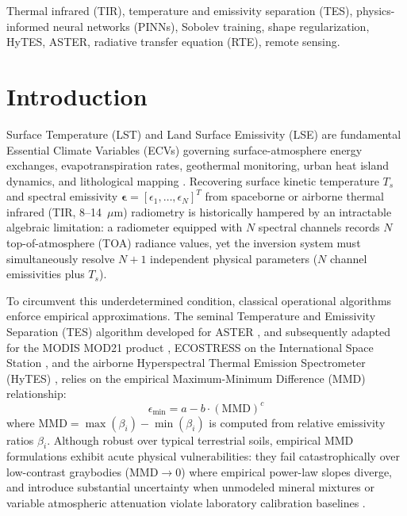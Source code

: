 \documentclass[journal]{IEEEtran}
\begin{document}
\begin{IEEEkeywords}
Thermal infrared (TIR), temperature and emissivity separation (TES), physics-informed neural networks (PINNs), Sobolev training, shape regularization, HyTES, ASTER, radiative transfer equation (RTE), remote sensing.
\end{IEEEkeywords}

\IEEEpeerreviewmaketitle

\section{Introduction}
 Surface Temperature (LST) and Land Surface Emissivity (LSE) are fundamental Essential Climate Variables (ECVs) governing surface-atmosphere energy exchanges, evapotranspiration rates, geothermal monitoring, urban heat island dynamics, and lithological mapping \cite{salisbury1992emissivity, hecker2011thermal, cawsenicholson2021nasa}. Recovering surface kinetic temperature $T_s$ and spectral emissivity $\bm{\epsilon} = [\epsilon_1, \dots, \epsilon_N]^T$ from spaceborne or airborne thermal infrared (TIR, 8--14~$\mu\text{m}$) radiometry is historically hampered by an intractable algebraic limitation: a radiometer equipped with $N$ spectral channels records $N$ top-of-atmosphere (TOA) radiance values, yet the inversion system must simultaneously resolve $N+1$ independent physical parameters ($N$ channel emissivities plus $T_s$).

To circumvent this underdetermined condition, classical operational algorithms enforce empirical approximations. The seminal Temperature and Emissivity Separation (TES) algorithm developed for ASTER \cite{gillespie1998temperature}, and subsequently adapted for the MODIS MOD21 product \cite{hulley2015mod21}, ECOSTRESS on the International Space Station \cite{hulley2018ecostress}, and the airborne Hyperspectral Thermal Emission Spectrometer (HyTES) \cite{hulley2012hytes, hook2013hyperspectral}, relies on the empirical Maximum-Minimum Difference (MMD) relationship:
\begin{equation}
\epsilon_{\min} = a - b \cdot (\text{MMD})^c
\label{eq:mmd_empirical}
\end{equation}
where $\text{MMD} = \max(\beta_i) - \min(\beta_i)$ is computed from relative emissivity ratios $\beta_i$. Although robust over typical terrestrial soils, empirical MMD formulations exhibit acute physical vulnerabilities: they fail catastrophically over low-contrast graybodies ($\text{MMD} \to 0$) where empirical power-law slopes diverge, and introduce substantial uncertainty when unmodeled mineral mixtures or variable atmospheric attenuation violate laboratory calibration baselines \cite{perezplanells2017retrieval}.
\end{document}
